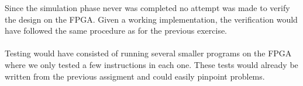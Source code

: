 Since the simulation phase never was completed no attempt was made to verify the design on the FPGA. Given a working implementation, the verification would have followed the same procedure as for the previous exercise. 
\\
\\
Testing would have consisted of running several smaller programs on the FPGA where we only tested a few instructions in each one. These tests would already be written from the previous assigment and could easily pinpoint problems.
